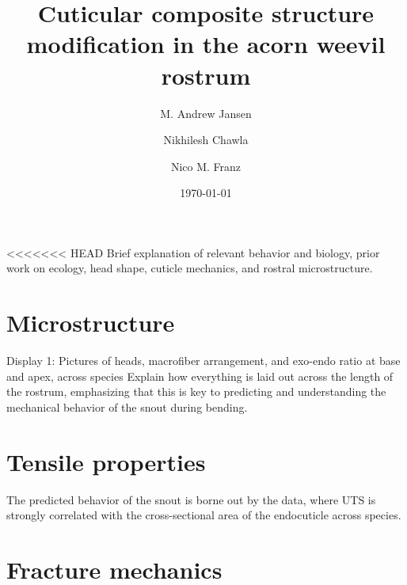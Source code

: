 \documentclass[twocolumn, linenumbers, superscriptaddress]{revtex4-1}
\begin{document}
	\begin{abstract}
		\blindtext
	\end{abstract}
	
	{\title{Cuticular composite structure modification in the acorn weevil rostrum}
	
	\date{\today}
	
	\author{M. Andrew Jansen}
	\author{Nikhilesh Chawla}
	\author{Nico M. Franz}
		
	\maketitle
	}
	
<<<<<<< HEAD
	Brief explanation of relevant behavior and biology, prior work on ecology, head shape, cuticle mechanics, and rostral microstructure.
	\lipsum
	
	\section*{Microstructure}
		Display 1: Pictures of heads, macrofiber arrangement, and exo-endo ratio at base and apex, across species
		Explain how everything is laid out across the length of the rostrum, emphasizing that this is key to predicting and understanding the mechanical behavior of the snout during bending.
		\lipsum

	\section*{Tensile properties}
		The predicted behavior of the snout is borne out by the data, where UTS is strongly correlated with the cross-sectional area of the endocuticle across species.
		\lipsum
	
	\section*{Fracture mechanics}
		\lipsum
		
\end{document}
